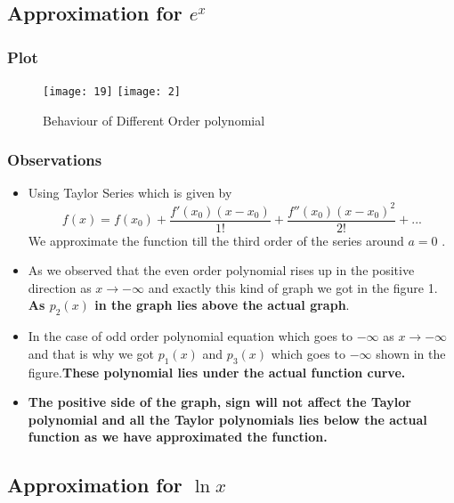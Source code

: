 \documentclass{article}
\begin{document}
\subsection{Approximation for $e^{x}$}
\subsubsection{Plot}
\begin{figure}[!h]
    \centering
    \texttt{[image: 19]}
    \texttt{[image: 2]}
    \caption{Behaviour of Different Order polynomial}
    \label{fig:ques1}
\end{figure}

\subsubsection{Observations}
\begin{itemize}
    
    \item Using Taylor Series which is given by \begin{equation} \label{eqn:taylor}f(x) = f(x_{0}) + \frac{ f'(x_{0})(x - x_{0})}{1!} + \frac{f''(x_0)(x - x_0)^2}{2!} + ...\end{equation}
    We approximate the function till the third order of the series around $a=0$ .
    
    \item As we observed that the even order polynomial rises up in the positive direction as $x\to -\infty$ and exactly this kind of graph we got in the figure 1. \textbf{As \textbf{$p_2(x)$} in the graph lies above the actual graph}. 
    
    \item In the case of odd order polynomial equation which goes to $-\infty$ as $x\to-\infty$ and that is why we got $p_1(x)$ and $p_3(x)$ which goes to $-\infty$ shown in the figure.\textbf{These polynomial lies under the actual function curve.}
    
    \item \textbf{The positive side of the graph, sign will not affect the Taylor polynomial and all the Taylor polynomials lies below the actual function as we have approximated the function.}
    
    
\end{itemize}

\newpage
\subsection{Approximation for $\ln{x}$}
\end{document}
